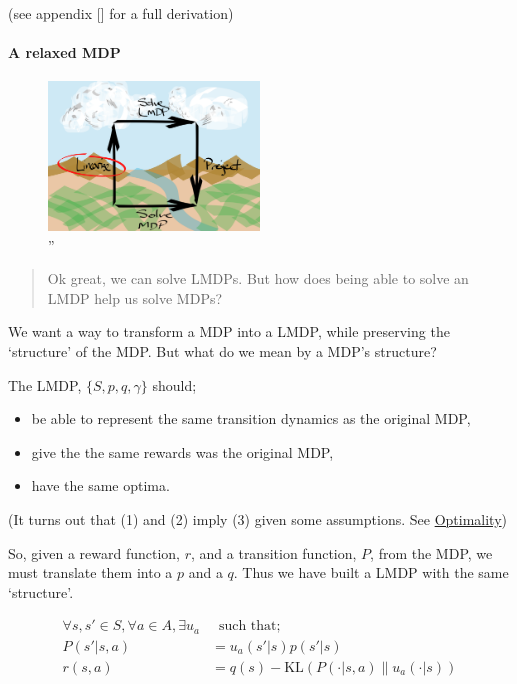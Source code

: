 (see appendix {[}{]} for a full derivation)

\hypertarget{a-relaxed-mdp}{%
\paragraph{A relaxed MDP}\label{a-relaxed-mdp}}

\begin{figure}
\centering
\includegraphics[width=0.5\textwidth,height=0.5\textheight]{../../pictures/drawings/abstract-representations-linear.png}
\caption{''}
\end{figure}

\begin{quote}
Ok great, we can solve LMDPs. But how does being able to solve an LMDP
help us solve MDPs?
\end{quote}

We want a way to transform a MDP into a LMDP, while preserving the
`structure' of the MDP. But what do we mean by a MDP's structure?

The LMDP, \(\{S, p, q, \gamma\}\) should;

\begin{itemize}
\tightlist
\item
  be able to represent the same transition dynamics as the original MDP,
\item
  give the the same rewards was the original MDP,
\item
  have the same optima.
\end{itemize}

(It turns out that (1) and (2) imply (3) given some assumptions. See
\href{}{Optimality})

So, given a reward function, \(r\), and a transition function, \(P\),
from the MDP, we must translate them into a \(p\) and a \(q\). Thus we
have built a LMDP with the same `structure'.

\begin{align}
\forall s, s' \in S, \forall a \in A, \exists u_a& \;\;\text{such that;} \\
P(s' | s, a) &= u_a(s'|s)p(s'|s) \tag{1}\\
r(s, a) &= q(s) - \text{KL}(P(\cdot | s, a) \parallel u_a(\cdot| s) ) \tag{2}\\
\end{align}

